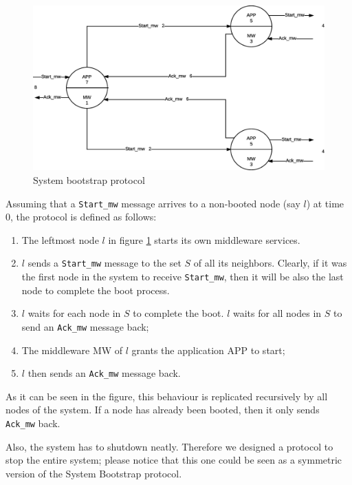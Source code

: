 \begin{figure}[H]
  \centering
  \includegraphics[width=\columnwidth]{images/solution/bootstrap.eps}
  \caption{System bootstrap protocol}
  \label{fig:sys-bootstrap-protocol}
\end{figure}

Assuming that a \texttt{Start\_mw} message arrives to a non-booted node (say
$l$) at time 0, the protocol is defined as follows:

\begin{enumerate}
  \item The leftmost node $l$ in figure \ref{fig:sys-bootstrap-protocol}
    starts its own middleware services.
  \item $l$ sends a \texttt{Start\_mw} message to the set $S$ of all its
    neighbors. Clearly, if it was the first node in the system to receive
    \texttt{Start\_mw}, then it will be also the last node to complete the
    boot process.
  \item $l$ waits for each node in $S$ to complete the boot. $l$ waits for all
nodes in $S$ to send an \texttt{Ack\_mw} message back;
  \item The middleware MW of $l$ grants the application APP to start;
  \item $l$ then sends an \texttt{Ack\_mw} message back.
\end{enumerate}

As it can be seen in the figure, this behaviour is replicated recursively
by all nodes of the system. If a node has already been booted, then it only
sends \texttt{Ack\_mw} back.

Also, the system has to shutdown neatly. Therefore we designed a protocol to
stop the entire system; please notice that this one could be seen as a
symmetric version of the System Bootstrap protocol.

